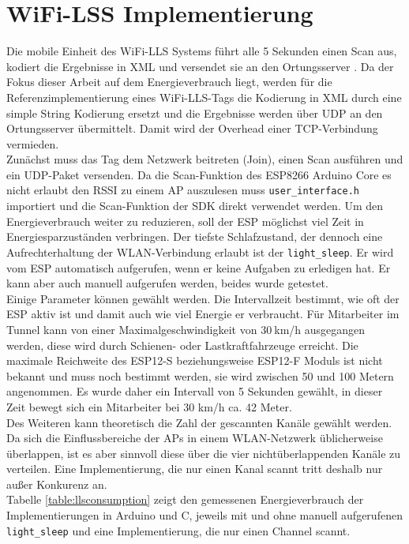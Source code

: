 \section{WiFi-LSS Implementierung}
Die mobile Einheit des WiFi-LLS Systems führt alle 5 Sekunden einen Scan aus, kodiert die Ergebnisse in XML und versendet sie an den Ortungsserver \cite{chen2007design}.
Da der Fokus dieser Arbeit auf dem Energieverbrauch liegt, werden für die Referenzimplementierung eines WiFi-LLS-Tags die Kodierung in XML durch eine simple String Kodierung ersetzt und die Ergebnisse werden über UDP an den Ortungsserver übermittelt. 
Damit wird der Overhead einer TCP-Verbindung vermieden.\\
Zunächst muss das Tag dem Netzwerk beitreten (Join), einen Scan ausführen und ein UDP-Paket versenden.
Da die Scan-Funktion des ESP8266 Arduino Core es nicht erlaubt den RSSI zu einem AP auszulesen muss \texttt{user\_interface.h} importiert und die Scan-Funktion der SDK direkt verwendet werden.
Um den Energieverbrauch weiter zu reduzieren, soll der ESP möglichst viel Zeit in Energiesparzuständen verbringen.
Der tiefste Schlafzustand, der dennoch eine Aufrechterhaltung der WLAN-Verbindung erlaubt ist der \texttt{light\_sleep}. 
Er wird vom ESP automatisch aufgerufen, wenn er keine Aufgaben zu erledigen hat.
Er kann aber auch manuell aufgerufen werden, beides wurde getestet.\\
Einige Parameter können gewählt werden. 
Die Intervallzeit bestimmt, wie oft der ESP aktiv ist und damit auch wie viel Energie er verbraucht.
Für Mitarbeiter im Tunnel kann von einer Maximalgeschwindigkeit von $30\ $km/h ausgegangen werden, diese wird durch Schienen- oder Lastkraftfahrzeuge erreicht. 
Die maximale Reichweite des ESP12-S beziehungsweise ESP12-F Moduls ist nicht bekannt und muss noch bestimmt werden, sie wird zwischen 50 und 100 Metern angenommen.
Es wurde daher ein Intervall von 5 Sekunden gewählt, in dieser Zeit bewegt sich ein Mitarbeiter bei 30 km/h ca. 42 Meter.\\
Des Weiteren kann theoretisch die Zahl der gescannten Kanäle gewählt werden. 
Da sich die Einflussbereiche der APs in einem WLAN-Netzwerk üblicherweise überlappen, ist es aber sinnvoll diese über die vier nichtüberlappenden Kanäle zu verteilen. 
Eine Implementierung, die nur einen Kanal scannt tritt deshalb nur außer Konkurenz an.\\
Tabelle \ref{table:llsconsumption} zeigt den gemessenen Energieverbrauch der Implementierungen in Arduino und C, jeweils mit und ohne manuell aufgerufenen \texttt{light\_sleep} und eine Implementierung, die nur einen Channel scannt.
